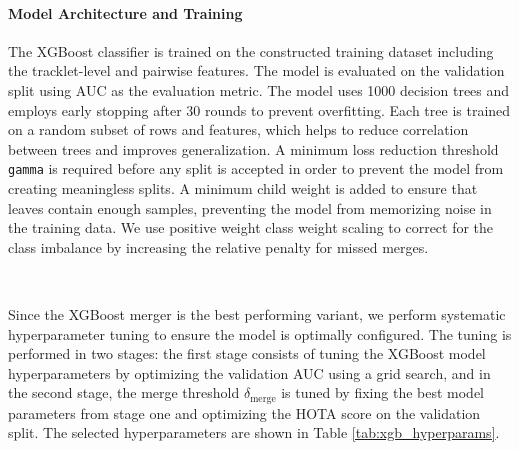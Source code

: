 \paragraph{Model Architecture and Training}
The XGBoost classifier is trained on the constructed training dataset including the tracklet-level and pairwise features. The model is evaluated on the validation split using AUC as the evaluation metric. The model uses 1000 decision trees and employs early stopping after 30 rounds to prevent overfitting. Each tree is trained on a random subset of rows and features, which helps to reduce correlation between trees and improves generalization. A minimum loss reduction threshold \texttt{gamma} is required before any split is accepted in order to prevent the model from creating meaningless splits. A minimum child weight is added to ensure that leaves contain enough samples, preventing the model from memorizing noise in the training data. We use positive weight class weight scaling to correct for the class imbalance by increasing the relative penalty for missed merges.

\

Since the XGBoost merger is the best performing variant, we perform systematic hyperparameter tuning to ensure the model is optimally configured. The tuning is performed in two stages: the first stage consists of tuning the XGBoost model hyperparameters by optimizing the validation AUC using a grid search, and in the second stage, the merge threshold $\delta_{\text{merge}}$ is tuned by fixing the best model parameters from stage one and optimizing the HOTA score on the validation split. The selected hyperparameters are shown in Table \ref{tab:xgb_hyperparams}.



